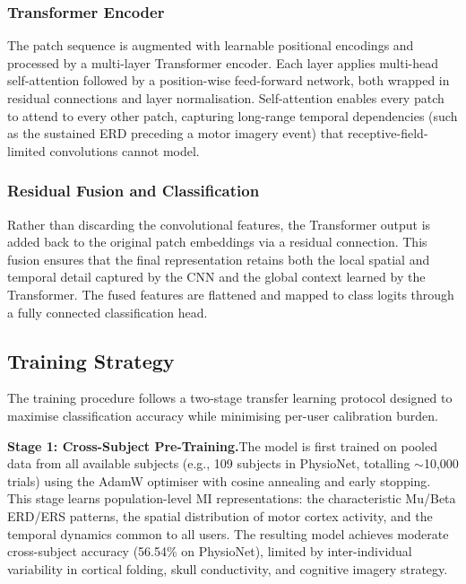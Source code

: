 \documentclass[12pt, a4paper]{article}
\begin{document}
\subsubsection{Transformer Encoder}

The patch sequence is augmented with learnable positional encodings and processed by a multi-layer Transformer encoder. Each layer applies multi-head self-attention followed by a position-wise feed-forward network, both wrapped in residual connections and layer normalisation. Self-attention enables every patch to attend to every other patch, capturing long-range temporal dependencies (such as the sustained ERD preceding a motor imagery event) that receptive-field-limited convolutions cannot model.

\subsubsection{Residual Fusion and Classification}

Rather than discarding the convolutional features, the Transformer output is added back to the original patch embeddings via a residual connection. This fusion ensures that the final representation retains both the local spatial and temporal detail captured by the CNN and the global context learned by the Transformer. The fused features are flattened and mapped to class logits through a fully connected classification head.

\subsection{Training Strategy}

The training procedure follows a two-stage transfer learning protocol designed to maximise classification accuracy while minimising per-user calibration burden.

\textbf{Stage 1: Cross-Subject Pre-Training.}\quad The model is first trained on pooled data from all available subjects (e.g., 109 subjects in PhysioNet, totalling $\sim$10,000 trials) using the AdamW optimiser with cosine annealing and early stopping. This stage learns population-level MI representations: the characteristic Mu/Beta ERD/ERS patterns, the spatial distribution of motor cortex activity, and the temporal dynamics common to all users. The resulting model achieves moderate cross-subject accuracy (56.54\% on PhysioNet), limited by inter-individual variability in cortical folding, skull conductivity, and cognitive imagery strategy.
\end{document}
